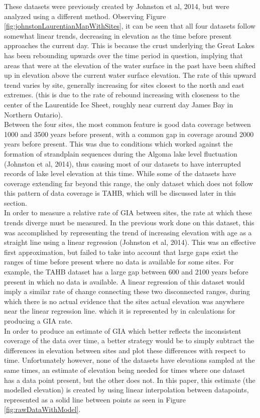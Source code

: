 \documentclass{article}
\begin{document}
 These datasets were previously created by
 Johnston et al, 2014, but were analyzed using a different method.
 Observing Figure \ref{fig:johnstonLaurentianMapWithSites}, it can be seen that
 all four datasets follow somewhat
 linear trends, decreasing in elevation as the time before present approaches the
 current day.
 This is because the crust underlying the Great Lakes has been rebounding upwards
 over the time period in question, implying that areas that were at the
 elevation of the water surface in the past have been shifted up in elevation
 above the current water surface elevation. The rate of this upward trend varies
 by site, generally increasing for sites closest to the north and east extremes.
 (this is due to the rate of rebound increasing with closeness to the center of
 the Laurentide Ice Sheet, roughly near current day James Bay in Northern Ontario).\\
 Between the four sites, the most common feature is good data coverage between
 1000 and 3500 years before present, with a common gap in coverage around 2000
 years before present. This was due to conditions which worked against the
 formation of strandplain sequences during the Algoma lake level fluctuation
 (Johnston et al, 2014), thus causing most of our datasets to have interrupted
 records of lake level elevation at this time. While some of the datasets have
 coverage extending far beyond this range, the only dataset which does not follow
 this pattern of data coverage is TAHB, which will be discussed later in this section.\\ 
 In order to measure a relative rate of GIA between sites, the rate at which these
 trends diverge must be measured. In the previous work done on this dataset, this
 was accomplished by representing the trend of increasing elevation with age as
 a straight line using a linear regression (Johnston et al, 2014). This was an
 effective first approximation, but failed to take into account that large gaps
 exist the ranges of time before present where no data is available for some
 sites. For example, the TAHB dataset has a large gap between 600 and 2100 years
 before present in which no data is available. A linear regression of this dataset
 would imply a similar rate of change connecting these two disconnected ranges,
 during which there is no actual evidence that the sites actual elevation was
 anywhere near the linear regression line. which it is represented by in
 calculations for producing a GIA rate.\\
 In order to produce an estimate of GIA which better reflects the inconsistent
 coverage of the data over time, a better strategy would be to simply subtract
 the differences in elevation between sites and plot these differences with
 respect to time. Unfortunately however, none of the datasets have elevations
 sampled at the same times, an estimate of elevation being needed for times where
 one dataset
 has a data point present, but the other does not. In this paper, this estimate 
 (the modelled elevation) is created by using linear interpolation between datapoints,
 represented as a solid line between points as seen in Figure \ref{fig:rawDataWithModel}.\\

\end{document}
